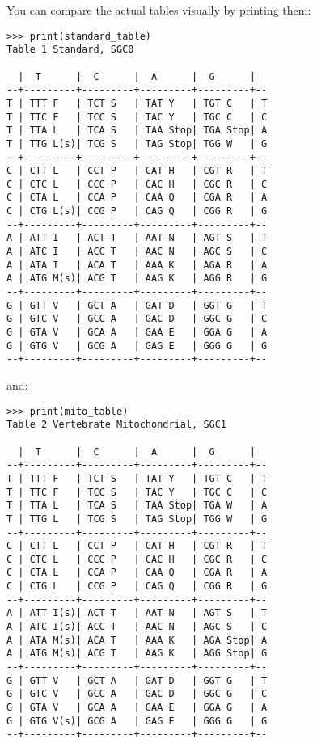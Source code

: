 You can compare the actual tables visually by printing them:
\begin{verbatim}
>>> print(standard_table)
Table 1 Standard, SGC0

  |  T      |  C      |  A      |  G      |
--+---------+---------+---------+---------+--
T | TTT F   | TCT S   | TAT Y   | TGT C   | T
T | TTC F   | TCC S   | TAC Y   | TGC C   | C
T | TTA L   | TCA S   | TAA Stop| TGA Stop| A
T | TTG L(s)| TCG S   | TAG Stop| TGG W   | G
--+---------+---------+---------+---------+--
C | CTT L   | CCT P   | CAT H   | CGT R   | T
C | CTC L   | CCC P   | CAC H   | CGC R   | C
C | CTA L   | CCA P   | CAA Q   | CGA R   | A
C | CTG L(s)| CCG P   | CAG Q   | CGG R   | G
--+---------+---------+---------+---------+--
A | ATT I   | ACT T   | AAT N   | AGT S   | T
A | ATC I   | ACC T   | AAC N   | AGC S   | C
A | ATA I   | ACA T   | AAA K   | AGA R   | A
A | ATG M(s)| ACG T   | AAG K   | AGG R   | G
--+---------+---------+---------+---------+--
G | GTT V   | GCT A   | GAT D   | GGT G   | T
G | GTC V   | GCC A   | GAC D   | GGC G   | C
G | GTA V   | GCA A   | GAA E   | GGA G   | A
G | GTG V   | GCG A   | GAG E   | GGG G   | G
--+---------+---------+---------+---------+--
\end{verbatim}
\noindent and:
\begin{verbatim}
>>> print(mito_table)
Table 2 Vertebrate Mitochondrial, SGC1

  |  T      |  C      |  A      |  G      |
--+---------+---------+---------+---------+--
T | TTT F   | TCT S   | TAT Y   | TGT C   | T
T | TTC F   | TCC S   | TAC Y   | TGC C   | C
T | TTA L   | TCA S   | TAA Stop| TGA W   | A
T | TTG L   | TCG S   | TAG Stop| TGG W   | G
--+---------+---------+---------+---------+--
C | CTT L   | CCT P   | CAT H   | CGT R   | T
C | CTC L   | CCC P   | CAC H   | CGC R   | C
C | CTA L   | CCA P   | CAA Q   | CGA R   | A
C | CTG L   | CCG P   | CAG Q   | CGG R   | G
--+---------+---------+---------+---------+--
A | ATT I(s)| ACT T   | AAT N   | AGT S   | T
A | ATC I(s)| ACC T   | AAC N   | AGC S   | C
A | ATA M(s)| ACA T   | AAA K   | AGA Stop| A
A | ATG M(s)| ACG T   | AAG K   | AGG Stop| G
--+---------+---------+---------+---------+--
G | GTT V   | GCT A   | GAT D   | GGT G   | T
G | GTC V   | GCC A   | GAC D   | GGC G   | C
G | GTA V   | GCA A   | GAA E   | GGA G   | A
G | GTG V(s)| GCG A   | GAG E   | GGG G   | G
--+---------+---------+---------+---------+--
\end{verbatim}

